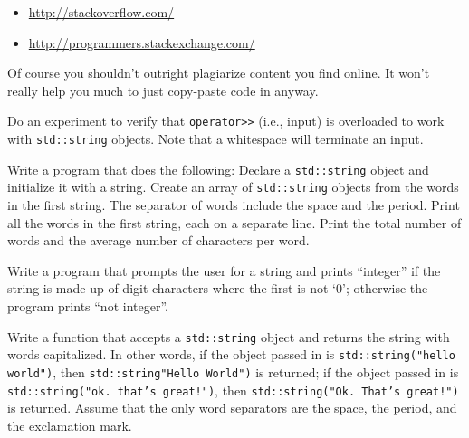 \begin{itemize}
\item
  \url{http://stackoverflow.com/}
\item
  \url{http://programmers.stackexchange.com/}
\end{itemize}

Of course you shouldn't outright plagiarize content you find online. It won't really help you much to just copy-paste code in anyway.

\newpage{}

\begin{ex}
Do an experiment to verify that \texttt{operator>>} (i.e., input) is overloaded to work with \texttt{std::string} objects. Note that a whitespace will terminate an input.
\end{ex}
\begin{ex}
Write a program that does the following: Declare a
\texttt{std::string} object and initialize it with a string. Create an
array of \texttt{std::string} objects from the words in the first string.
The separator of words include the space and the period. Print all the
words in the first string, each on a separate line. Print the total
number of words and the average number of characters per word.
\end{ex}
\begin{ex}
Write a program that prompts the user for a string
and prints ``integer'' if the string is made up of digit characters
where the first is not `0'; otherwise the program prints ``not
integer''.
\end{ex}
\begin{ex}
Write a function that accepts a \texttt{std::string}
object and returns the string with words capitalized. In other words, if
the object passed in is \texttt{std::string("hello world")}, then
\texttt{std::string"Hello World")} is returned; if the object passed in is
\texttt{std::string("ok. that's great!")}, then \texttt{std::string("Ok.
That's great!")} is returned. Assume that the only word separators are
the space, the period, and the exclamation mark.
\end{ex}
